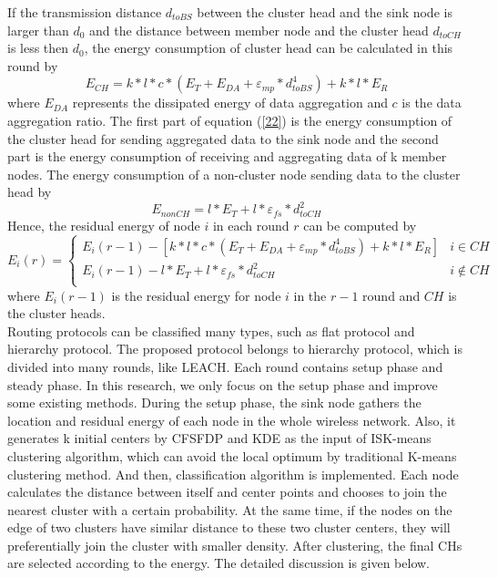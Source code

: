 \documentclass[11pt]{report}
\begin{document}
	If the transmission distance $d_{toBS}$ between the cluster head and the sink node is larger than $d_0$ and the distance between member node and the cluster head $d_{toCH}$ is less then $d_0$, the energy consumption of cluster head can be calculated in this round by
	\begin{equation}
	\label{22}
	E_{CH} = k*l*c*\left(E_{T} + E_{DA} + \varepsilon_{mp}*d^4_{toBS}\right) + k*l*E_R
	\end{equation}
	where $E_{DA}$ represents the dissipated energy of data aggregation and $c$ is the data aggregation ratio. The first part of equation (\ref{22}) is the energy consumption of the cluster head for sending aggregated data to the sink node and the second part is the energy consumption of receiving and aggregating data of k member nodes. The energy consumption of a non-cluster node sending data to the cluster head by
	\begin{equation}
	E_{nonCH} = l * E_T + l * \varepsilon_{fs} * d^2_{toCH}
	\end{equation}
	Hence, the residual energy of node $i$ in each round $r$ can be computed by
	\begin{equation}
	\label{24}
	E_i\left(r\right)=\left\{ \begin{array}{ll}
	E_i\left(r-1\right) - [ k*l*c*\left(E_{T} + E_{DA} + \varepsilon_{mp} * d^4_{toBS}\right) + k*l*E_R]& i \in CH \\
	E_i\left(r-1\right) - l * E_T + l * \varepsilon_{fs} * d^2_{toCH} & i \notin CH \\
	\end{array} \right.
	\end{equation}
	where $E_i\left(r-1\right)$ is the residual energy for node $i$ in the $r-1$ round and $CH$ is the cluster heads.\\


	 Routing protocols can be classified many types, such as flat protocol and hierarchy protocol. The proposed protocol belongs to hierarchy protocol, which is divided into many rounds, like LEACH. Each round contains setup phase and steady phase. In this research, we only focus on the setup phase and improve some existing methods. During the setup phase,  the sink node gathers the location and residual energy of each node in the whole wireless network. Also, it generates k initial centers by CFSFDP and KDE as the input of ISK-means clustering algorithm, which can avoid the local optimum by traditional K-means clustering method. And then, classification algorithm is implemented. Each node calculates the distance between itself and center points and chooses to join the nearest cluster with a certain probability. At the same time, if the nodes on the edge of two clusters have similar distance to these two cluster centers, they will preferentially join the cluster with smaller density. After clustering, the final CHs are selected according to the energy. The detailed discussion is given below.
	
\end{document}
